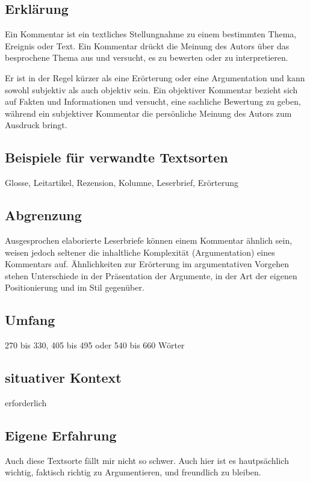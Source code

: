 \subsection{Erklärung}

Ein Kommentar ist ein textliches Stellungnahme zu einem bestimmten Thema, Ereignis oder Text. Ein Kommentar drückt die Meinung des Autors über das besprochene Thema aus und versucht, es zu bewerten oder zu interpretieren.

Er ist in der Regel kürzer als eine Erörterung oder eine Argumentation und kann sowohl subjektiv als auch objektiv sein. Ein objektiver Kommentar bezieht sich auf Fakten und Informationen und versucht, eine sachliche Bewertung zu geben, während ein subjektiver Kommentar die persönliche Meinung des Autors zum Ausdruck bringt.



\subsection{Beispiele für verwandte Textsorten}
Glosse, Leitartikel, Rezension, Kolumne, Leserbrief, Erörterung
\subsection{Abgrenzung} Ausgesprochen elaborierte Leserbriefe können einem Kommentar
ähnlich sein, weisen jedoch seltener die inhaltliche Komplexität
(Argumentation) eines Kommentars auf. Ähnlichkeiten zur Erörterung
im argumentativen Vorgehen stehen Unterschiede in der Präsentation der Argumente, in der Art der eigenen Positionierung und im Stil
gegenüber.
\subsection{Umfang}
270 bis 330, 405 bis 495 oder 540 bis 660 Wörter

\subsection{situativer Kontext}erforderlich
\subsection{Eigene Erfahrung}Auch diese Textsorte fällt mir nicht so schwer. Auch hier ist es hautpsächlich wichtig, faktisch richtig zu Argumentieren, und freundlich zu bleiben.
